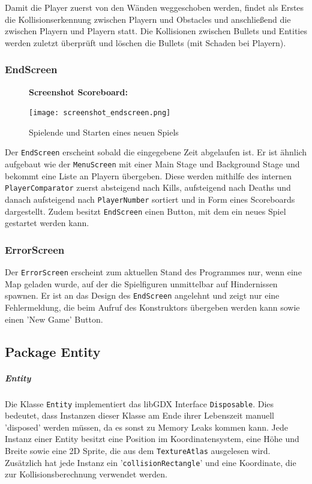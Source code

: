 \documentclass[a4paper]{scrreprt}
\def\code#1{\texttt{#1}}
\begin{document}
Damit die Player zuerst von den Wänden weggeschoben werden, findet als Erstes die Kollisionserkennung zwischen Playern und Obstacles und anschließend die zwischen Playern und Playern statt. Die Kollisionen zwischen Bullets und Entities werden zuletzt überprüft und löschen die Bullets (mit Schaden bei Playern).
\newpage
\subsubsection{EndScreen}
\begin{figure}[H]
  \textbf{Screenshot Scoreboard:}\par\medskip
  \centering
\texttt{[image: screenshot\_endscreen.png]}    
\caption{Spielende und Starten eines neuen Spiels}
\end{figure}
Der \code{EndScreen} erscheint sobald die eingegebene Zeit abgelaufen ist. Er ist ähnlich aufgebaut wie der \code{MenuScreen} mit einer Main Stage und Background Stage und bekommt eine Liste an Playern übergeben. Diese werden mithilfe des internen \code{PlayerComparator} zuerst absteigend nach Kills, aufsteigend nach Deaths und danach aufsteigend nach \code{PlayerNumber} sortiert und in Form eines Scoreboards dargestellt. Zudem besitzt \code{EndScreen} einen Button, mit dem ein neues Spiel gestartet werden kann.


\subsubsection*{ErrorScreen}
Der \code{ErrorScreen} erscheint zum aktuellen Stand des Programmes nur, wenn eine Map geladen wurde, auf der die Spielfiguren unmittelbar auf Hindernissen spawnen.
Er ist an das Design des \code{EndScreen} angelehnt und zeigt nur eine Fehlermeldung, die beim Aufruf des Konstruktors übergeben werden kann sowie einen 'New Game' Button.

\newpage
\subsection{Package Entity}
\subparagraph{Entity}
Die Klasse \code{Entity} implementiert das libGDX Interface \code{Disposable}. Dies bedeutet, dass Instanzen dieser Klasse am Ende ihrer Lebenszeit manuell 'disposed' werden müssen, da es sonst zu Memory Leaks kommen kann. 
Jede Instanz einer Entity besitzt eine Position im Koordinatensystem, eine Höhe und Breite sowie eine 2D Sprite, die aus dem \code{TextureAtlas} ausgelesen wird.
Zusätzlich hat jede Instanz ein '\code{collisionRectangle}' und eine Koordinate, die zur Kollisionsberechnung verwendet werden.
\end{document}
